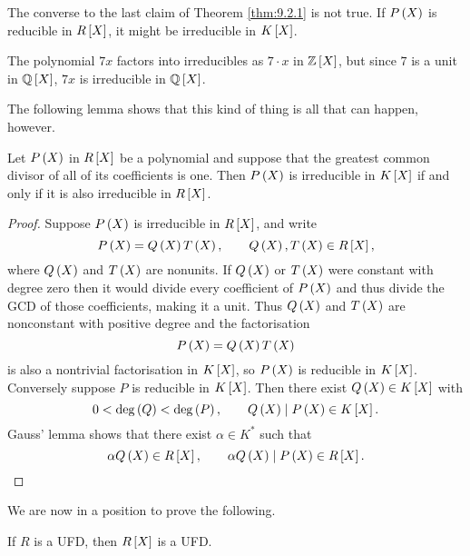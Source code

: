 \begin{note*}
The converse to the last claim of Theorem \ref{thm:9.2.1} is not true. If $ P\br{X} $ is reducible in $ R\sbr{X} $, it might be irreducible in $ K\sbr{X} $.
\end{note*}

\begin{example*}
The polynomial $ 7x $ factors into irreducibles as $ 7 \cdot x $ in $ \Z\sbr{X} $, but since $ 7 $ is a unit in $ \Q\sbr{X} $, $ 7x $ is irreducible in $ \Q\sbr{X} $.
\end{example*}

The following lemma shows that this kind of thing is all that can happen, however.

\begin{proposition}
Let $ P\br{X} $ in $ R\sbr{X} $ be a polynomial and suppose that the greatest common divisor of all of its coefficients is one. Then $ P\br{X} $ is irreducible in $ K\sbr{X} $ if and only if it is also irreducible in $ R\sbr{X} $.
\end{proposition}

\begin{proof}
Suppose $ P\br{X} $ is irreducible in $ R\sbr{X} $, and write
$$ P\br{X} = Q\br{X}T\br{X}, \qquad Q\br{X}, T\br{X} \in R\sbr{X}, $$
where $ Q\br{X} $ and $ T\br{X} $ are nonunits. If $ Q\br{X} $ or $ T\br{X} $ were constant with degree zero then it would divide every coefficient of $ P\br{X} $ and thus divide the GCD of those coefficients, making it a unit. Thus $ Q\br{X} $ and $ T\br{X} $ are nonconstant with positive degree and the factorisation
$$ P\br{X} = Q\br{X}T\br{X} $$
is also a nontrivial factorisation in $ K\sbr{X} $, so $ P\br{X} $ is reducible in $ K\sbr{X} $. Conversely suppose $ P $ is reducible in $ K\sbr{X} $. Then there exist $ Q\br{X} \in K\sbr{X} $ with
$$ 0 < \deg\br{Q} < \deg\br{P}, \qquad Q\br{X} \mid P\br{X} \in K\sbr{X}. $$
Gauss' lemma shows that there exist $ \alpha \in K^* $ such that
$$ \alpha Q\br{X} \in R\sbr{X}, \qquad \alpha Q\br{X} \mid P\br{X} \in R\sbr{X}. $$
\end{proof}

\pagebreak

We are now in a position to prove the following.

\begin{theorem}
If $ R $ is a UFD, then $ R\sbr{X} $ is a UFD.
\end{theorem}

